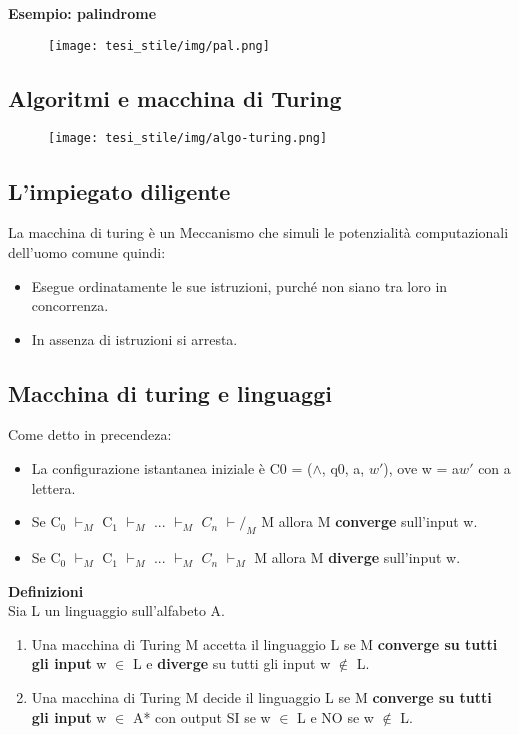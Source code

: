 \textbf{Esempio: palindrome}
\begin{figure}[htp]
    \centering
     \texttt{[image: tesi\_stile/img/pal.png]}
\end{figure}
\newpage
\subsection{Algoritmi e macchina di Turing}
\begin{figure}[htp]
    \centering
     \texttt{[image: tesi\_stile/img/algo-turing.png]}
\end{figure}
\subsection{L'impiegato diligente}
La macchina di turing è un Meccanismo che simuli le potenzialità computazionali dell’uomo comune quindi: 
\begin{itemize}
    \item Esegue ordinatamente le sue istruzioni, purché non siano tra loro in concorrenza.
    
    \item In assenza di istruzioni si arresta.
\end{itemize}
\newpage
\subsection{Macchina di turing e linguaggi}
Come detto in precendeza:
\begin{itemize}
    \item La configurazione istantanea iniziale è C0 = ($\wedge$, q0, a, $w'$), ove w = a$w'$
    con a lettera.
    
    \item Se C$_0$ $\vdash_M$ C$_1$ $\vdash_M$ ... $\vdash_M$ $C_n$ $\vdash/_M$ M allora M \textbf{converge} sull’input w.
    
    \item Se C$_0$ $\vdash_M$ C$_1$ $\vdash_M$ ... $\vdash_M$ $C_n$ $\vdash_M$ M allora M \textbf{diverge} sull’input w.
\end{itemize}
\textbf{Definizioni}\\
Sia L un linguaggio sull’alfabeto A.
\begin{enumerate}
    \item Una macchina di Turing M accetta il linguaggio L se M \textbf{converge su tutti gli input} w $\in$ L e \textbf{diverge} su tutti gli input w $\not \in$ L.
    
    \item Una macchina di Turing M decide il linguaggio L se M \textbf{converge su tutti gli input} w $\in$ A* con output SI se w $\in$ L e NO se w $\not \in$ L.
\end{enumerate}
